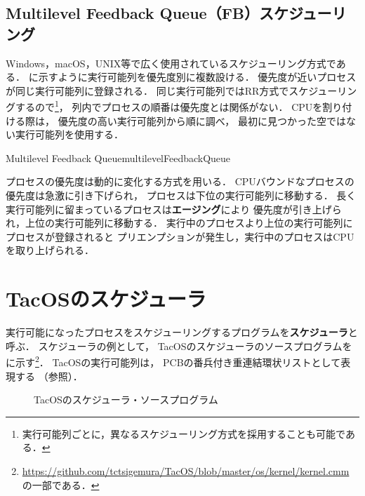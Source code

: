 \subsection{Multilevel Feedback Queue（FB）スケジューリング}
Windows，macOS，UNIX等で広く使用されているスケジューリング方式である．
に示すように実行可能列を優先度別に複数設ける．
優先度が近いプロセスが同じ実行可能列に登録される．
同じ実行可能列ではRR方式でスケジューリングするので\footnote{
実行可能列ごとに，異なるスケジューリング方式を採用することも可能である．
}，
列内でプロセスの順番は優先度とは関係がない．
CPUを割り付ける際は，
優先度の高い実行可能列から順に調べ，
最初に見つかった空ではない実行可能列を使用する．

{Multilevel Feedback Queue}{multilevelFeedbackQueue}

プロセスの優先度は動的に変化する方式を用いる．
CPUバウンドなプロセスの優先度は急激に引き下げられ，
プロセスは下位の実行可能列に移動する．
長く実行可能列に留まっているプロセスは{\bf エージング}により
優先度が引き上げられ，上位の実行可能列に移動する．
実行中のプロセスより上位の実行可能列にプロセスが登録されると
プリエンプションが発生し，実行中のプロセスはCPUを取り上げられる．

\section{TacOSのスケジューラ}
実行可能になったプロセスをスケジューリングするプログラムを{\bf スケジューラ}と呼ぶ．
スケジューラの例として，
TacOSのスケジューラのソースプログラムをに示す\footnote{
\url{https://github.com/tctsigemura/TacOS/blob/master/os/kernel/kernel.cmm}
の一部である．}．
TacOSの実行可能列は，
PCBの番兵付き重連結環状リストとして表現する
（参照）．

\begin{figure}[btp]

\caption{TacOSのスケジューラ・ソースプログラム}
\label{fig:tacosSch}
\end{figure}

